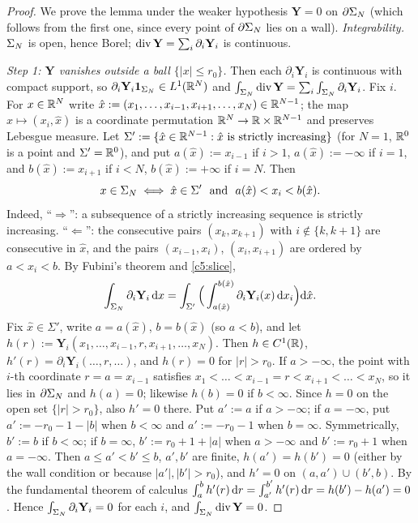 \begin{proof}
We prove the lemma under the weaker hypothesis $\mathbf Y=0$ on $\partial\Sigma_N$ (which follows from the first one, since every point of $\partial\Sigma_N$ lies on a wall).
\emph{Integrability.} $\Sigma_N$ is open, hence Borel; $\operatorname{div}\mathbf Y=\sum_i\partial_i\mathbf Y_i$ is continuous.

\emph{Step 1: $\mathbf Y$ vanishes outside a ball $\{|x|\le r_0\}$.} Then each $\partial_i\mathbf Y_i$ is continuous with compact support, so $\partial_i\mathbf Y_i\mathbf 1_{\Sigma_N}\in L^1(\mathbb{R}^N)$ and $\int_{\Sigma_N}\operatorname{div}\mathbf Y=\sum_i\int_{\Sigma_N}\partial_i\mathbf Y_i$. Fix $i$.
For $x\in\mathbb{R}^N$ write $\hat x:=(x_1,\dots,x_{i-1},x_{i+1},\dots,x_N)\in\mathbb{R}^{N-1}$; the map $x\mapsto(x_i,\hat x)$ is a coordinate permutation $\mathbb{R}^N\to\mathbb{R}\times\mathbb{R}^{N-1}$ and preserves Lebesgue measure.
Let $\Sigma':=\{\hat x\in\mathbb{R}^{N-1}:\hat x\text{ is strictly increasing}\}$ (for $N=1$, $\mathbb{R}^0$ is a point and $\Sigma'=\mathbb{R}^0$), and put $a(\hat x):=x_{i-1}$ if $i>1$, $a(\hat x):=-\infty$ if $i=1$, and $b(\hat x):=x_{i+1}$ if $i<N$, $b(\hat x):=+\infty$ if $i=N$. Then
\begin{equation}\label{c5:slice}
x\in\Sigma_N\iff\hat x\in\Sigma'\ \text{ and }\ a(\hat x)<x_i<b(\hat x).
\end{equation}
Indeed, ``$\Rightarrow$'': a subsequence of a strictly increasing sequence is strictly increasing. ``$\Leftarrow$'': the consecutive pairs $(x_k,x_{k+1})$ with $i\notin\{k,k+1\}$ are consecutive in $\hat x$, and the pairs $(x_{i-1},x_i)$, $(x_i,x_{i+1})$ are ordered by $a<x_i<b$.
By Fubini's theorem and \eqref{c5:slice},
\[\int_{\Sigma_N}\partial_i\mathbf Y_i\,\mathrm{d} x=\int_{\Sigma'}\Big(\int_{a(\hat x)}^{b(\hat x)}\partial_i\mathbf Y_i(x)\,\mathrm{d} x_i\Big)\mathrm{d}\hat x .\]
Fix $\hat x\in\Sigma'$, write $a=a(\hat x)$, $b=b(\hat x)$ (so $a<b$), and let $h(r):=\mathbf Y_i(x_1,\dots,x_{i-1},r,x_{i+1},\dots,x_N)$. Then $h\in C^1(\mathbb{R})$, $h'(r)=\partial_i\mathbf Y_i(\dots,r,\dots)$, and $h(r)=0$ for $|r|>r_0$.
If $a>-\infty$, the point with $i$-th coordinate $r=a=x_{i-1}$ satisfies $x_1<\dots<x_{i-1}=r<x_{i+1}<\dots<x_N$, so it lies in $\partial\Sigma_N$ and $h(a)=0$; likewise $h(b)=0$ if $b<\infty$.
Since $h=0$ on the open set $\{|r|>r_0\}$, also $h'=0$ there. Put $a':=a$ if $a>-\infty$; if $a=-\infty$, put $a':=-r_0-1-|b|$ when $b<\infty$ and $a':=-r_0-1$ when $b=\infty$. Symmetrically, $b':=b$ if $b<\infty$; if $b=\infty$, $b':=r_0+1+|a|$ when $a>-\infty$ and $b':=r_0+1$ when $a=-\infty$.
Then $a\le a'<b'\le b$, $a',b'$ are finite, $h(a')=h(b')=0$ (either by the wall condition or because $|a'|,|b'|>r_0$), and $h'=0$ on $(a,a')\cup(b',b)$. By the fundamental theorem of calculus
$\int_a^bh'(r)\,\mathrm{d} r=\int_{a'}^{b'}h'(r)\,\mathrm{d} r=h(b')-h(a')=0$.
Hence $\int_{\Sigma_N}\partial_i\mathbf Y_i=0$ for each $i$, and $\int_{\Sigma_N}\operatorname{div}\mathbf Y=0$.


\end{proof}
